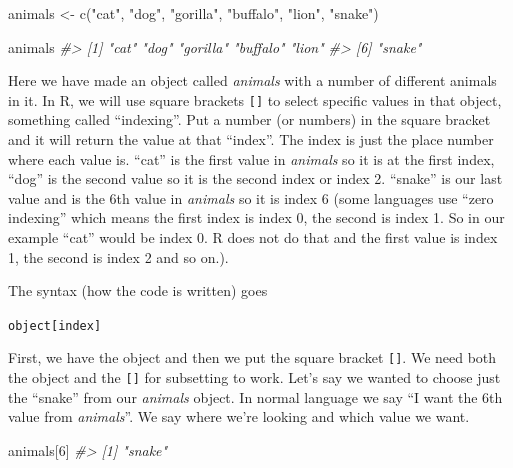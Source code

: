\documentclass[
]{krantz}
\makeatletter
\newenvironment{Shaded}{\begin{snugshade}}{\end{snugshade}}
\newcommand{\CommentTok}[1]{\textcolor[rgb]{0.37,0.37,0.37}{\textit{#1}}}
\newcommand{\DecValTok}[1]{\textcolor[rgb]{0.06,0.06,0.06}{#1}}
\newcommand{\FunctionTok}[1]{\textcolor[rgb]{0,0,0}{#1}}
\newcommand{\NormalTok}[1]{#1}
\newcommand{\OtherTok}[1]{\textcolor[rgb]{0.37,0.37,0.37}{#1}}
\newcommand{\StringTok}[1]{\textcolor[rgb]{0.5,0.5,0.5}{#1}}
\newenvironment{kframe}{%
\medskip{}
\setlength{\fboxsep}{.8em}
 \def\at@end@of@kframe{}%
 \ifinner\ifhmode%
  \def\at@end@of@kframe{\end{minipage}}%
  \begin{minipage}{\columnwidth}%
 \fi\fi%
 \def\FrameCommand##1{\hskip\@totalleftmargin \hskip-\fboxsep
 \colorbox{shadecolor}{##1}\hskip-\fboxsep
     \hskip-\linewidth \hskip-\@totalleftmargin \hskip\columnwidth}%
 \MakeFramed {\advance\hsize-\width
   \@totalleftmargin\z@ \linewidth\hsize
   \@setminipage}}%
 {\par\unskip\endMakeFramed%
 \at@end@of@kframe}
\renewenvironment{Shaded}{\begin{kframe}}{\end{kframe}}
\makeatother
\begin{document}
\begin{Shaded}
\begin{Highlighting}[]
\NormalTok{animals }\OtherTok{\textless{}{-}} \FunctionTok{c}\NormalTok{(}\StringTok{"cat"}\NormalTok{, }\StringTok{"dog"}\NormalTok{, }\StringTok{"gorilla"}\NormalTok{, }\StringTok{"buffalo"}\NormalTok{, }\StringTok{"lion"}\NormalTok{, }\StringTok{"snake"}\NormalTok{)}
\end{Highlighting}
\end{Shaded}

\begin{Shaded}
\begin{Highlighting}[]
\NormalTok{animals}
\CommentTok{\#\textgreater{} [1] "cat"     "dog"     "gorilla" "buffalo" "lion"   }
\CommentTok{\#\textgreater{} [6] "snake"}
\end{Highlighting}
\end{Shaded}

Here we have made an object called \emph{animals} with a number of different animals in it. In R, we will use square brackets \texttt{{[}{]}} to select specific values in that object, something called ``indexing''. Put a number (or numbers) in the square bracket and it will return the value at that ``index''. The index is just the place number where each value is. ``cat'' is the first value in \emph{animals} so it is at the first index, ``dog'' is the second value so it is the second index or index 2. ``snake'' is our last value and is the 6th value in \emph{animals} so it is index 6 (some languages use ``zero indexing'' which means the first index is index 0, the second is index 1. So in our example ``cat'' would be index 0. R does not do that and the first value is index 1, the second is index 2 and so on.).

The syntax (how the code is written) goes

\texttt{object{[}index{]}}

First, we have the object and then we put the square bracket \texttt{{[}{]}}. We need both the object and the \texttt{{[}{]}} for subsetting to work. Let's say we wanted to choose just the ``snake'' from our \emph{animals} object. In normal language we say ``I want the 6th value from \emph{animals}''. We say where we're looking and which value we want.

\begin{Shaded}
\begin{Highlighting}[]
\NormalTok{animals[}\DecValTok{6}\NormalTok{]}
\CommentTok{\#\textgreater{} [1] "snake"}
\end{Highlighting}
\end{Shaded}
\end{document}
